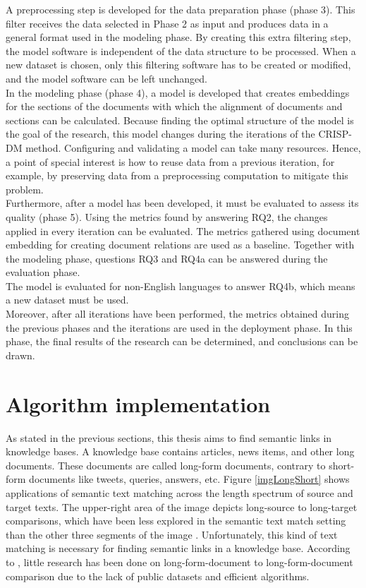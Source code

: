 A preprocessing step is developed for the data preparation phase (phase 3). This filter receives the data selected in Phase 2 as input and produces data in a general format used in the modeling phase. By creating this extra filtering step, the model software is independent of the data structure to be processed. When a new dataset is chosen, only this filtering software has to be created or modified, and the model software can be left unchanged.\\

In the modeling phase (phase 4), a model is developed that creates embeddings for the sections of the documents with which the alignment of documents and sections can be calculated. Because finding the optimal structure of the model is the goal of the research, this model changes during the iterations of the CRISP-DM method. Configuring and validating a model can take many resources. Hence, a point of special interest is how to reuse data from a previous iteration, for example, by preserving data from a preprocessing computation to mitigate this problem.\\

Furthermore, after a model has been developed, it must be evaluated to assess its quality (phase 5). Using the metrics found by answering RQ2, the changes applied in every iteration can be evaluated. The metrics gathered using document embedding for creating document relations are used as a baseline. Together with the modeling phase, questions RQ3 and RQ4a can be answered during the evaluation phase.\\
The model is evaluated for non-English languages to answer RQ4b, which means a new dataset must be used. \\

Moreover, after all iterations have been performed, the metrics obtained during the previous phases and the iterations are used in the deployment phase.  In this phase, the final results of the research can be determined, and conclusions can be drawn.

 
\section{Algorithm implementation}
\label{secApproach}
\label{secResearchMethod}
As stated in the previous sections, this thesis aims to find semantic links in knowledge bases. A knowledge base contains articles, news items, and other long documents. These documents are called long-form documents, contrary to short-form documents like tweets, queries, answers, etc. Figure \ref{imgLongShort} shows applications of semantic text matching across the length spectrum of source and target texts. The upper-right area of the image depicts long-source to long-target comparisons, which have been less explored in the semantic text match setting than the other three segments of the image \citep{jiang2019semantic}. Unfortunately, this kind of text matching is necessary for finding semantic links in a knowledge base. According to \citet{Pang2021}, little research has been done on long-form-document to long-form-document comparison due to the lack of public datasets and efficient algorithms. \\

